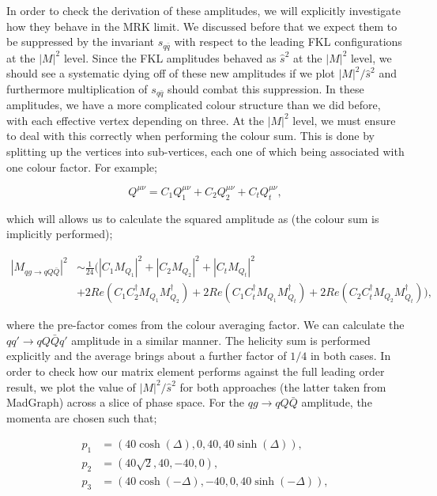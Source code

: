 In order to check the derivation of these amplitudes, we will explicitly investigate how they behave in the MRK limit. We discussed before that we expect them to be suppressed by the invariant $s_{q\bar{q}}$ with respect to the leading FKL configurations at the $|M|^2$ level. Since the FKL amplitudes behaved as $\hat{s}^2$ at the $|M|^2$ level, we should see a systematic dying off of these new amplitudes if we plot $|M|^2/\hat{s}^2$ and furthermore multiplication of $s_{q \bar{q}}$ should combat this suppression. In these amplitudes, we have a more complicated colour structure than we did before, with each effective vertex depending on three. At the $|M|^2$ level, we must ensure to deal with this correctly when performing the colour sum. This is done by splitting up the vertices into sub-vertices, each one of which being associated with one colour factor. For example;

\begin{equation}
Q^{\mu \nu} = C_1 Q^{\mu \nu}_1 + C_2 Q^{\mu \nu}_2 + C_t Q^{\mu \nu}_t,
\end{equation}

which will allows us to calculate the squared amplitude as (the colour sum is implicitly performed);

\begin{equation}
\begin{split}
|M_{qg \to qQ\bar{Q}}|^2 &\sim \frac{1}{24} \bigg(|C_1 M_{Q_1}|^2 + |C_2 M_{Q_2}|^2 + |C_t M_{Q_t}|^2 \\
&+ 2 Re(C_1 C_2^\dagger M_{Q_1}M^\dagger_{Q_2}) + 2 Re(C_1 C_t^\dagger M_{Q_1}M^\dagger_{Q_t}) + 2 Re(C_2 C_t^\dagger M_{Q_2}M^\dagger_{Q_t}) \bigg),
\end{split}
\end{equation}

where the pre-factor comes from the colour averaging factor. We can calculate the $qq' \to qQ\bar{Q}q'$ amplitude in a similar manner. The helicity sum is performed explicitly and the average brings about a further factor of $1/4$ in both cases. In order to check how our matrix element performs against the full leading order result, we plot the value of $|M|^2/\hat{s}^2$ for both approaches (the latter taken from MadGraph) across a slice of phase space. For the $qg \to qQ\bar{Q}$ amplitude, the momenta are chosen such that;

\begin{equation}
\begin{split}
p_1 & = (40 \cosh(\Delta), 0, 40, 40 \sinh(\Delta)), \\
p_2 & = (40 \sqrt{2}, 40 , -40, 0), \\
p_3 & = (40 \cosh(-\Delta), -40, 0, 40 \sinh(-\Delta)), 
\end{split}
\end{equation}

